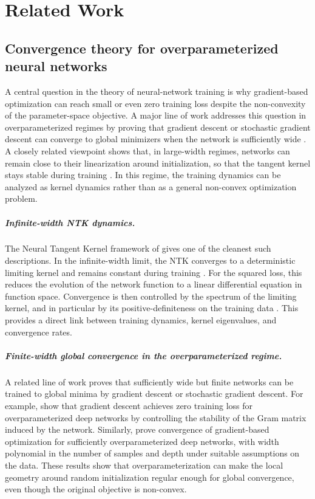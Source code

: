 \chapter{Related Work}\label{cha:related}

\section{Convergence theory for overparameterized neural networks}
\label{sec:related-convergence}

A central question in the theory of neural-network training is why
gradient-based optimization can reach small or even zero training loss despite
the non-convexity of the parameter-space objective. A major line of work
addresses this question in overparameterized regimes by proving that gradient
descent or stochastic gradient descent can converge to global minimizers when
the network is sufficiently wide
\citep{du2019gradient,allen2019convergence,
	arora2019finegrainedanalysisoptimizationgeneralization}.
A closely related viewpoint shows that, in large-width regimes, networks can
remain close to their linearization around initialization, so that the tangent
kernel stays stable during training
\citep{jacot2018ntk,lee2020wide}. In this regime, the training dynamics can be
analyzed as kernel dynamics rather than as a general non-convex optimization
problem.

\paragraph{Infinite-width NTK dynamics.}
The Neural Tangent Kernel framework of \citet{jacot2018ntk} gives one of the
cleanest such descriptions. In the infinite-width limit, the NTK converges to a
deterministic limiting kernel and remains constant during training
\citep{jacot2018ntk,lee2020wide}. For the squared loss, this reduces the
evolution of the network function to a linear differential equation in function
space. Convergence is then controlled by the spectrum of the limiting kernel,
and in particular by its positive-definiteness on the training data
\citep{jacot2018ntk}. This provides a direct link between training dynamics,
kernel eigenvalues, and convergence rates.

\paragraph{Finite-width global convergence in the overparameterized regime.}
A related line of work proves that sufficiently wide but finite networks can be
trained to global minima by gradient descent or stochastic gradient descent. For
example, \citet{du2019gradient} show that gradient descent achieves zero
training loss for overparameterized deep networks by controlling the stability
of the Gram matrix induced by the network. Similarly,
\citet{allen2019convergence} prove convergence of gradient-based optimization
for sufficiently overparameterized deep networks, with width polynomial in the
number of samples and depth under suitable assumptions on the data. These
results show that overparameterization can make the local geometry around
random initialization regular enough for global convergence, even though the
original objective is non-convex.

